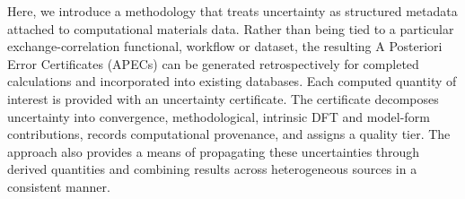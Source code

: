 \documentclass[prb,twocolumn,superscriptaddress,amsmath,amssymb,longbibliography]{revtex4-2}
\newcommand{\conv}{\mathrm{conv}}
\newcommand{\meth}{\mathrm{method}}
\begin{document}
Here, we introduce a methodology that treats uncertainty as structured metadata attached to computational materials data. Rather than being tied to a particular exchange-correlation functional, workflow or dataset, the resulting A Posteriori Error Certificates (APECs) can be generated retrospectively for completed calculations and incorporated into existing databases. Each computed quantity of interest is provided with an uncertainty certificate. The certificate decomposes uncertainty into convergence, methodological, intrinsic DFT and model-form contributions, records computational provenance, and assigns a quality tier. The approach also provides a means of propagating these uncertainties through derived quantities and combining results across heterogeneous sources in a consistent manner. 
\end{document}
